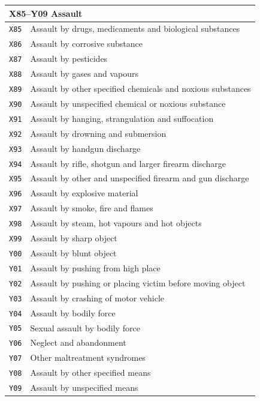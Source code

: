 \begin{longtable}{p{2.2cm} p{10.3cm}}
\multicolumn{2}{l}{\textbf{X85--Y09 \quad Assault}} \\
\midrule
\texttt{X85} & Assault by drugs, medicaments and biological substances \\
\texttt{X86} & Assault by corrosive substance \\
\texttt{X87} & Assault by pesticides \\
\texttt{X88} & Assault by gases and vapours \\
\texttt{X89} & Assault by other specified chemicals and noxious substances \\
\texttt{X90} & Assault by unspecified chemical or noxious substance \\
\texttt{X91} & Assault by hanging, strangulation and suffocation \\
\texttt{X92} & Assault by drowning and submersion \\
\texttt{X93} & Assault by handgun discharge \\
\texttt{X94} & Assault by rifle, shotgun and larger firearm discharge \\
\texttt{X95} & Assault by other and unspecified firearm and gun discharge \\
\texttt{X96} & Assault by explosive material \\
\texttt{X97} & Assault by smoke, fire and flames \\
\texttt{X98} & Assault by steam, hot vapours and hot objects \\
\texttt{X99} & Assault by sharp object \\
\texttt{Y00} & Assault by blunt object \\
\texttt{Y01} & Assault by pushing from high place \\
\texttt{Y02} & Assault by pushing or placing victim before moving object \\
\texttt{Y03} & Assault by crashing of motor vehicle \\
\texttt{Y04} & Assault by bodily force \\
\texttt{Y05} & Sexual assault by bodily force \\
\texttt{Y06} & Neglect and abandonment \\
\texttt{Y07} & Other maltreatment syndromes \\
\texttt{Y08} & Assault by other specified means \\
\texttt{Y09} & Assault by unspecified means \\[6pt]


\end{longtable}
